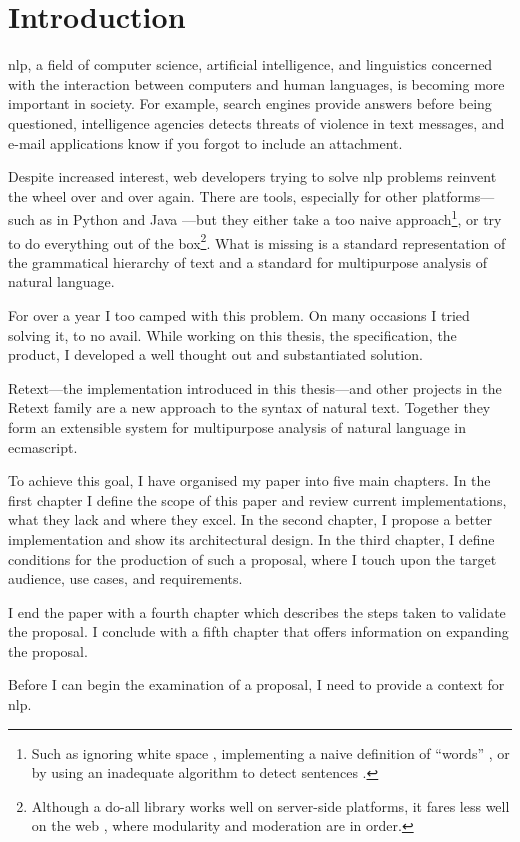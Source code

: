 
\begingroup
\let\clearpage\relax
\let\cleardoublepage\relax
\let\cleardoublepage\relax

\chapter*{Introduction}

\Gls{nlp}, a field of computer science, artificial intelligence, and
  linguistics concerned with the interaction between computers and human
  languages, is becoming more important in society.
For example, search engines provide answers before being questioned,
  intelligence agencies detects threats of violence in text messages, and
  e-mail applications know if you forgot to include an attachment.

Despite increased interest, web developers trying to solve \gls{nlp} problems
reinvent the wheel over and over again. There are tools,
especially for other platforms---such as in Python
\autocite{nltk-source} and Java \autocite{opennlp-source}---but they either
take a too naive approach\footnote{Such as ignoring white space
  \autocite{loadfive/knwl-source-code}, implementing a naive
  definition of ``words'' \autocite{nhunzaker/speakeasy-source-code},
  or by using an inadequate algorithm to detect sentences
  \autocite[][]{nytimes/emphasis-source-code}.}, or try to do everything out
of the box\footnote{Although a do-all library works well on server-side
  platforms, it fares less well on the web \autocite[such
  as][]{NaturalNode/natural-source-code}, where modularity and moderation
  are in order.}. What is missing is a standard representation of the
grammatical hierarchy of text and a standard for multipurpose analysis of
natural language.

For over a year I too camped with this problem. On many occasions I
tried solving it, to no avail. While working on this thesis, the
specification, the product, I developed a well thought out and substantiated
solution.

Retext---the implementation introduced in this thesis---and other projects
in the Retext family are a new approach to the syntax of natural text.
Together they form an extensible system for multipurpose analysis of natural
language in \gls{ecmascript}.

To achieve this goal, I have organised my paper into five main chapters. In
the first chapter I define the scope of this paper and review current
implementations, what they lack and where they excel. In the second
chapter, I propose a better implementation and show its architectural
design. In the third chapter, I define conditions for the production of
such a proposal, where I touch upon the target audience, use cases, and
requirements.

I end the paper with a fourth chapter which describes the steps taken to
validate the proposal. I conclude with a fifth chapter that offers
information on expanding the proposal.

Before I can begin the examination of a proposal, I need to provide a
context for \gls{nlp}.

\endgroup
